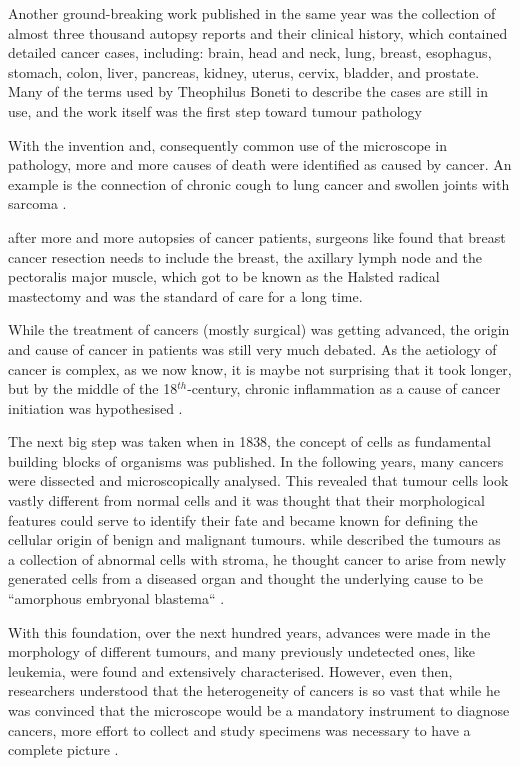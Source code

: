 Another ground-breaking work published in the same year was the collection of almost three thousand autopsy reports and their clinical history, which contained  detailed cancer cases, including: brain, head and neck, lung, breast, esophagus, stomach, colon, liver, pancreas, kidney, uterus, cervix, bladder, and prostate. Many of the terms used by Theophilus Boneti to describe the cases are still in use, and the work itself was the first step toward tumour pathology \cite{Hajdu2010a}

With the invention and, consequently common use of the microscope in pathology, more and more causes of death were identified as caused by cancer. An example is the connection of chronic cough to lung cancer and swollen joints with sarcoma \cite{Etmueller2018}.

 after more and more autopsies of cancer patients, surgeons like \textcite{Heister1747} found that breast cancer resection needs to include the breast, the axillary lymph node and the pectoralis major muscle, which got to be known as the Halsted radical mastectomy and was the standard of care for a long time.

While the treatment of cancers (mostly surgical) was getting  advanced, the origin and cause of cancer in patients was still very much debated. As the aetiology of cancer is complex, as we now know, it is maybe not surprising that it took longer, but by  the middle of the 18$^{th}$-century, chronic inflammation as a cause of cancer initiation was hypothesised \cite{Hajdu2010b}.

The next big step was taken when in 1838, the concept of cells as fundamental building blocks of organisms was published. In the following years, many cancers were dissected and microscopically analysed. This  revealed that tumour cells look vastly different from normal cells and it was thought that their morphological features could serve to identify their fate and became known for defining the cellular origin of benign and malignant tumours.  while \citeauthor{Mueller1838} described the tumours as a collection of abnormal cells with stroma, he thought cancer to arise from newly generated cells from a diseased organ and thought the underlying cause to be ``amorphous embryonal blastema`` \cite{Mueller1838}.

With this foundation, over the next hundred years,  advances were made in the morphology of different tumours, and many previously undetected ones, like leukemia, were found and extensively characterised. However, even then,  researchers  understood that the heterogeneity of cancers is so vast that while he was convinced that the microscope would be a mandatory instrument to diagnose cancers, more effort to collect and study specimens was necessary to have a complete picture \cite{Bennett1849}.

